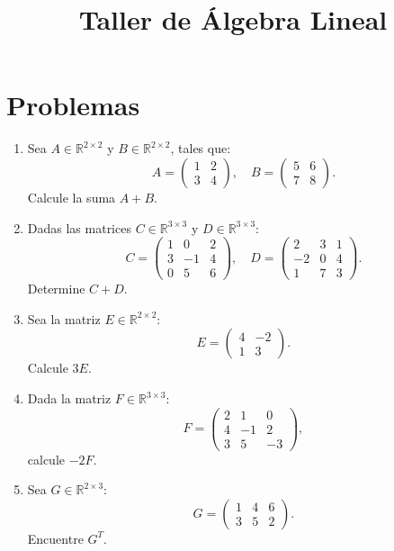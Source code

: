 \documentclass{article}
\title{Taller de Álgebra Lineal}
\date{}
\begin{document}
\maketitle

\section*{Problemas}

\begin{enumerate}
\item  Sea \( A \in \mathbb{R}^{2 \times 2} \) y \( B \in \mathbb{R}^{2 \times 2} \), tales que:
\[
A = \begin{pmatrix} 1 & 2 \\ 3 & 4 \end{pmatrix}, \quad B = \begin{pmatrix} 5 & 6 \\ 7 & 8 \end{pmatrix}.
\]
Calcule la suma \( A + B \).

\item Dadas las matrices \( C \in \mathbb{R}^{3 \times 3} \) y \( D \in \mathbb{R}^{3 \times 3} \):
\[
C = \begin{pmatrix} 1 & 0 & 2 \\ 3 & -1 & 4 \\ 0 & 5 & 6 \end{pmatrix}, \quad D = \begin{pmatrix} 2 & 3 & 1 \\ -2 & 0 & 4 \\ 1 & 7 & 3 \end{pmatrix}.
\]
Determine \( C + D \).

\item Sea la matriz \( E \in \mathbb{R}^{2 \times 2} \):
\[
E = \begin{pmatrix} 4 & -2 \\ 1 & 3 \end{pmatrix}.
\]
Calcule \( 3E \).

\item  Dada la matriz \( F \in \mathbb{R}^{3 \times 3} \):
\[
F = \begin{pmatrix} 2 & 1 & 0 \\ 4 & -1 & 2 \\ 3 & 5 & -3 \end{pmatrix},
\]
calcule \( -2F \).

\item Sea \( G \in \mathbb{R}^{2 \times 3} \):
\[
G = \begin{pmatrix} 1 & 4 & 6 \\ 3 & 5 & 2 \end{pmatrix}.
\]
Encuentre \( G^T \).




\end{enumerate}
\end{document}
